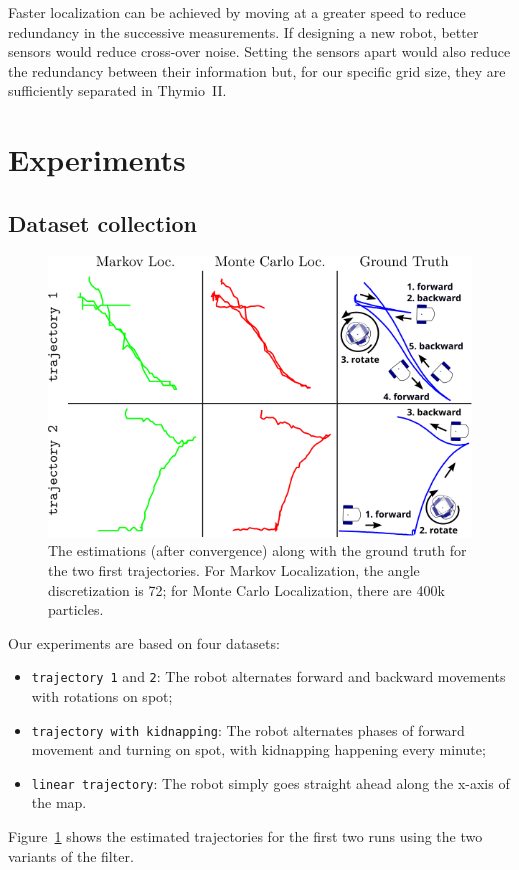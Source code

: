 \documentclass[letterpaper, 10pt, conference]{ieeeconf}
\newcommand{\Fig}[1]{Figure~\ref{fig:#1}}
\begin{document}
Faster localization can be achieved by moving at a greater speed to reduce redundancy in the successive measurements.
If designing a new robot, better sensors would reduce cross-over noise.
Setting the sensors apart would also reduce the redundancy between their information but, for our specific grid size, they are sufficiently separated in Thymio~II.

\section{Experiments}

\subsection{Dataset collection}

\begin{figure}
\includegraphics{trajectories}
\caption{The estimations (after convergence) along with the ground truth for the two first trajectories.
For Markov Localization, the angle discretization is 72; for Monte Carlo Localization, there are 400k particles.
}
\label{fig:trajectories}
\end{figure}

Our experiments are based on four datasets:
\begin{itemize}
\item \texttt{trajectory 1} and \texttt{2}: The robot alternates forward and backward movements with rotations on spot;
\item \texttt{trajectory with kidnapping}: The robot alternates phases of forward movement and turning on spot, with kidnapping happening every minute;
\item \texttt{linear trajectory}: The robot simply goes straight ahead along the x-axis of the map.
\end{itemize}
\Fig{trajectories} shows the estimated trajectories for the first two runs using the two variants of the filter.
\end{document}
